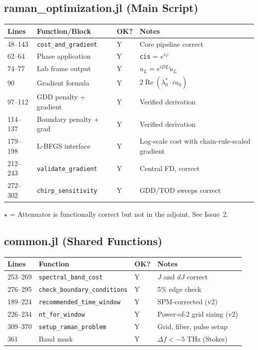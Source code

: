 \documentclass[12pt,a4paper]{article}
\newcommand{\Real}{\operatorname{Re}}
\theoremstyle{definition}
\begin{document}
\subsection{raman\_optimization.jl (Main Script)}

\begin{center}
\begin{tabular}{p{1.5cm}p{5cm}p{1cm}p{3cm}}
\toprule
\textbf{Lines} & \textbf{Function/Block} & \textbf{OK?} & \textbf{Notes} \\
\midrule
48--143 & \texttt{cost\_and\_gradient} & Y & Core pipeline correct \\
62--64 & Phase application & Y & \texttt{cis} = $e^{i\varphi}$ \\
74--77 & Lab frame output & Y & $u_L = e^{iDL}\tilde u_L$ \\
90 & Gradient formula & Y & $2\Real(\lambda_0^* \cdot iu_0)$ \\
97--112 & GDD penalty + gradient & Y & Verified derivation \\
114--137 & Boundary penalty + grad & Y & Verified derivation \\
179--198 & L-BFGS interface & Y & Log-scale cost with chain-rule-scaled gradient \\
212--243 & \texttt{validate\_gradient} & Y & Central FD, correct \\
272--302 & \texttt{chirp\_sensitivity} & Y & GDD/TOD sweeps correct \\
\bottomrule
\end{tabular}
\end{center}

$\star$ = Attenuator is functionally correct but not in the adjoint. See Issue~2.

\subsection{common.jl (Shared Functions)}

\begin{center}
\begin{tabular}{p{1.5cm}p{5cm}p{1cm}p{3cm}}
\toprule
\textbf{Lines} & \textbf{Function} & \textbf{OK?} & \textbf{Notes} \\
\midrule
253--269 & \texttt{spectral\_band\_cost} & Y & $J$ and $dJ$ correct \\
276--295 & \texttt{check\_boundary\_conditions} & Y & 5\% edge check \\
189--224 & \texttt{recommended\_time\_window} & Y & SPM-corrected (v2) \\
226--234 & \texttt{nt\_for\_window} & Y & Power-of-2 grid sizing (v2) \\
309--370 & \texttt{setup\_raman\_problem} & Y & Grid, fiber, pulse setup \\
361 & Band mask & Y & $\Delta f < -5$ THz (Stokes) \\
\bottomrule
\end{tabular}
\end{center}
\end{document}
